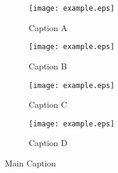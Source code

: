 \begin{figure}[ht]  \centering
    \begin{minipage}{1\textwidth} \centering
        \begin{subfigure}[b]{0.5\linewidth} \centering
            \texttt{[image: example.eps]} 
            \small\caption{Caption A} 
            \label{fig:fig10}
            \vspace{4ex}
        \end{subfigure}%
        \begin{subfigure}[b]{0.5\linewidth} \centering
            \texttt{[image: example.eps]} 
            \small\caption{Caption B} 
            \label{fig:fig11}
            \vspace{4ex}
        \end{subfigure}
        \begin{subfigure}[b]{0.5\linewidth} \centering
            \texttt{[image: example.eps]} 
            \small\caption{Caption C} 
            \label{fig:fig12} 
        \end{subfigure}%
        \begin{subfigure}[b]{0.5\linewidth} \centering
            \texttt{[image: example.eps]} 
            \small\caption{Caption D} 
            \label{fig:fig13} 
        \end{subfigure} 
        \small\caption{Main Caption}
        \label{fig:fig_grid} 
    \end{minipage}
\end{figure}%
